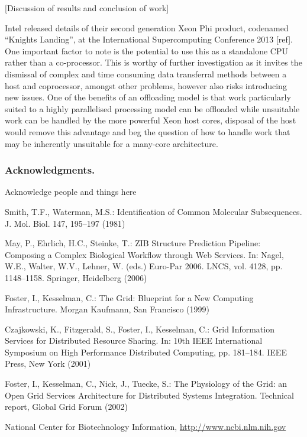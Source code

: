 \documentclass[runningheads,a4paper]{llncs}
\begin{document}
[Discussion of results and conclusion of work]

Intel released details of their second generation Xeon Phi product, codenamed “Knights Landing”,  at the International 
Supercomputing Conference 2013 [ref]. One important factor to note is the potential to use this as a standalone CPU 
rather than a co-processor. This is worthy of further investigation as it invites the dismissal of complex and time 
consuming data transferral methods between a host and coprocessor, amongst other problems, however also risks 
introducing new issues. One of the benefits of an offloading model is that work particularly suited to a highly 
parallelised processing model can be offloaded while unsuitable work can be handled by the more powerful Xeon host 
cores, disposal of the host would remove this advantage and beg the question of how to handle work that may be 
inherently unsuitable for a many-core architecture.
 

\subsubsection{Acknowledgments.}

Acknowledge people and things here


\begin{thebibliography}{4}

 Smith, T.F., Waterman, M.S.: Identification of Common Molecular
Subsequences. J. Mol. Biol. 147, 195--197 (1981)

 May, P., Ehrlich, H.C., Steinke, T.: ZIB Structure Prediction Pipeline:
Composing a Complex Biological Workflow through Web Services. In: Nagel,
W.E., Walter, W.V., Lehner, W. (eds.) Euro-Par 2006. LNCS, vol. 4128,
pp. 1148--1158. Springer, Heidelberg (2006)

 Foster, I., Kesselman, C.: The Grid: Blueprint for a New Computing
Infrastructure. Morgan Kaufmann, San Francisco (1999)

 Czajkowski, K., Fitzgerald, S., Foster, I., Kesselman, C.: Grid
Information Services for Distributed Resource Sharing. In: 10th IEEE
International Symposium on High Performance Distributed Computing, pp.
181--184. IEEE Press, New York (2001)

 Foster, I., Kesselman, C., Nick, J., Tuecke, S.: The Physiology of the
Grid: an Open Grid Services Architecture for Distributed Systems
Integration. Technical report, Global Grid Forum (2002)

 National Center for Biotechnology Information, \url{http://www.ncbi.nlm.nih.gov}

\end{thebibliography}
\end{document}
